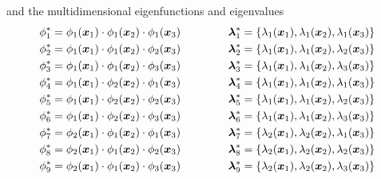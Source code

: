 \documentclass[]{interact}
\theoremstyle{plain}%
\theoremstyle{definition}
\theoremstyle{remark}
\begin{document}
\noindent and the multidimensional eigenfunctions and eigenvalues
%
\begin{eqnarray}
\phi^{\ast}_1= \phi_{1}(\bm{x}_1) \cdot \phi_{1}(\bm{x}_2) \cdot \phi_{1}(\bm{x}_3) \hspace{1.5cm} \bm{\lambda}^{\ast}_1= \{\lambda_1(\bm{x}_1), \lambda_1(\bm{x}_2), \lambda_1(\bm{x}_3)\} \nonumber \\
%
\phi^{\ast}_2= \phi_{1}(\bm{x}_1) \cdot \phi_{1}(\bm{x}_2) \cdot \phi_{2}(\bm{x}_3) \hspace{1.5cm} \bm{\lambda}^{\ast}_2= \{\lambda_1(\bm{x}_1), \lambda_1(\bm{x}_2), \lambda_2(\bm{x}_3)\} \nonumber \\
%
\phi^{\ast}_3= \phi_{1}(\bm{x}_1) \cdot \phi_{1}(\bm{x}_2) \cdot \phi_{3}(\bm{x}_3) \hspace{1.5cm} \bm{\lambda}^{\ast}_3= \{\lambda_1(\bm{x}_1), \lambda_1(\bm{x}_2), \lambda_3(\bm{x}_3)\} \nonumber \\
%
\phi^{\ast}_4= \phi_{1}(\bm{x}_1) \cdot \phi_{2}(\bm{x}_2) \cdot \phi_{1}(\bm{x}_3) \hspace{1.5cm} \bm{\lambda}^{\ast}_4= \{\lambda_1(\bm{x}_1), \lambda_1(\bm{x}_2), \lambda_1(\bm{x}_3)\} \nonumber \\
%
\phi^{\ast}_5= \phi_{1}(\bm{x}_1) \cdot \phi_{2}(\bm{x}_2) \cdot \phi_{2}(\bm{x}_3) \hspace{1.5cm} \bm{\lambda}^{\ast}_5= \{\lambda_1(\bm{x}_1), \lambda_1(\bm{x}_2), \lambda_2(\bm{x}_3)\} \nonumber \\
%
\phi^{\ast}_6= \phi_{1}(\bm{x}_1) \cdot \phi_{2}(\bm{x}_2) \cdot \phi_{3}(\bm{x}_3) \hspace{1.5cm} \bm{\lambda}^{\ast}_6= \{\lambda_1(\bm{x}_1), \lambda_1(\bm{x}_2), \lambda_3(\bm{x}_3)\} \nonumber \\
%
\phi^{\ast}_7= \phi_{2}(\bm{x}_1) \cdot \phi_{1}(\bm{x}_2) \cdot \phi_{1}(\bm{x}_3) \hspace{1.5cm} \bm{\lambda}^{\ast}_7= \{\lambda_2(\bm{x}_1), \lambda_2(\bm{x}_2), \lambda_1(\bm{x}_3)\} \nonumber \\
%
\phi^{\ast}_8= \phi_{2}(\bm{x}_1) \cdot \phi_{1}(\bm{x}_2) \cdot \phi_{2}(\bm{x}_3) \hspace{1.5cm} \bm{\lambda}^{\ast}_8= \{\lambda_2(\bm{x}_1), \lambda_2(\bm{x}_2), \lambda_2(\bm{x}_3)\} \nonumber \\
%
\phi^{\ast}_9= \phi_{2}(\bm{x}_1) \cdot \phi_{1}(\bm{x}_2) \cdot \phi_{3}(\bm{x}_3) \hspace{1.5cm} \bm{\lambda}^{\ast}_9= \{\lambda_2(\bm{x}_1), \lambda_2(\bm{x}_2), \lambda_3(\bm{x}_3)\} \nonumber \\

\end{eqnarray}
\end{document}
